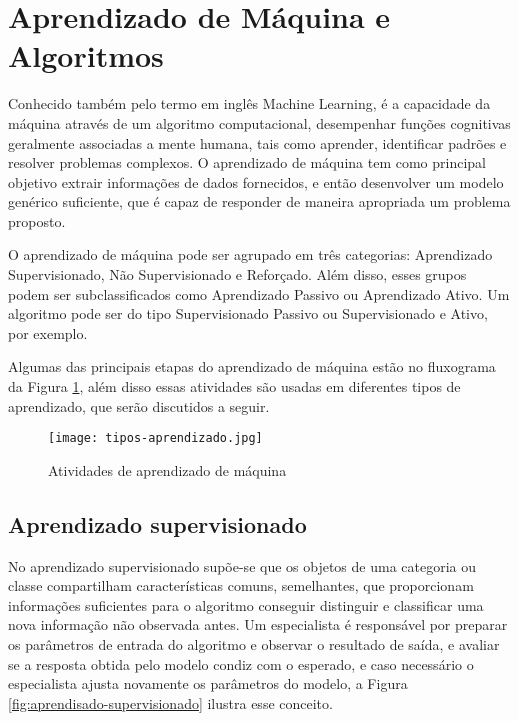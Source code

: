 \section{Aprendizado de Máquina e Algoritmos}\label{sec:LABEL_CHP_4_SEC_A}


Conhecido também pelo termo em inglês Machine Learning, é a capacidade da máquina através de um algoritmo computacional, desempenhar funções cognitivas geralmente associadas a mente humana, tais como aprender, identificar padrões e resolver problemas complexos\cite{michalski2013machine}. O aprendizado de máquina tem como principal objetivo extrair informações de dados fornecidos, e então desenvolver um modelo genérico suficiente, que é capaz de responder de maneira apropriada um problema proposto.

O aprendizado de máquina pode ser agrupado em três categorias: Aprendizado Supervisionado, Não Supervisionado e Reforçado. Além disso, esses grupos podem ser subclassificados como Aprendizado Passivo ou Aprendizado Ativo. Um algoritmo pode ser do tipo Supervisionado Passivo ou Supervisionado e Ativo, por exemplo.

Algumas das principais etapas do aprendizado de máquina estão no fluxograma da Figura \ref{fig:tipos-aprendizado},  além disso essas atividades são usadas em diferentes tipos de aprendizado, que serão discutidos a seguir.


\begin{figure}[ht]
    \centering
    \texttt{[image: tipos-aprendizado.jpg]} 
    \caption{Atividades de aprendizado de máquina}
    \label{fig:tipos-aprendizado}
\end{figure}

\pagebreak

\subsection{Aprendizado supervisionado}\label{sec:LABEL_CHP_4_SEC_A_SUB_A}

No aprendizado supervisionado supõe-se que os objetos de uma categoria ou classe compartilham características comuns, semelhantes, que proporcionam informações suficientes para o algoritmo conseguir distinguir e classificar uma nova informação não observada antes. Um especialista é responsável por preparar os parâmetros de entrada do algoritmo e observar o resultado de saída, e avaliar se a resposta obtida pelo modelo condiz com o esperado, e caso necessário o especialista ajusta novamente os parâmetros do modelo, a Figura \ref{fig:aprendisado-supervisionado} ilustra esse conceito.



